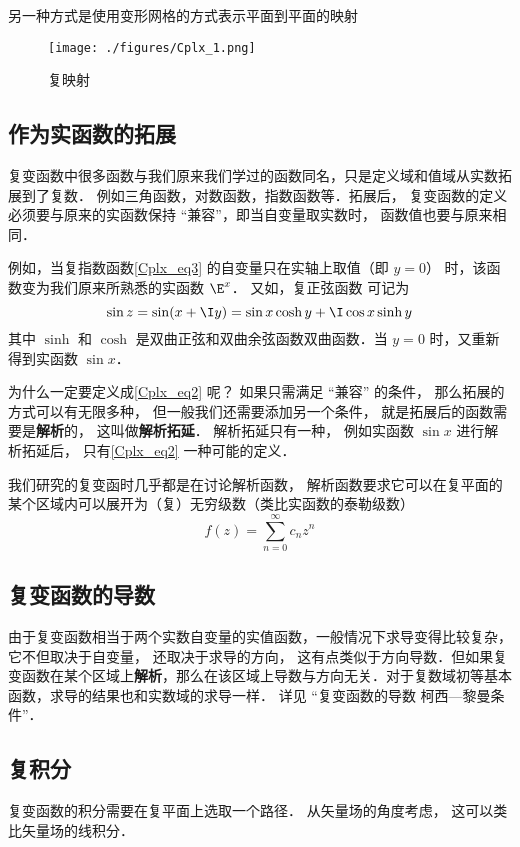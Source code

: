 另一种方式是使用变形网格的方式表示平面到平面的映射
\begin{figure}[ht]
\centering
\texttt{[image: ./figures/Cplx\_1.png]}
\caption{复映射} \label{Cplx_fig1}
\end{figure}

\subsection{作为实函数的拓展}
复变函数中很多函数与我们原来我们学过的函数同名，只是定义域和值域从实数拓展到了复数． 例如三角函数，对数函数，指数函数等．拓展后， 复变函数的定义必须要与原来的实函数保持 “兼容”，即当自变量取实数时， 函数值也要与原来相同．

例如，当复指数函数\autoref{Cplx_eq3} 的自变量只在实轴上取值（即 $y = 0$） 时，该函数变为我们原来所熟悉的实函数 $\E^x$．  又如，复正弦函数 可记为
\begin{equation}\label{Cplx_eq2}
\sin z = \sin(x + \I y) = \sin x\cosh y + \I\cos x\sinh y
\end{equation}
其中 $\sinh $ 和 $\cosh $ 是双曲正弦和双曲余弦函数双曲函数．当 $y = 0$ 时，又重新得到实函数 $\sin x$．

为什么一定要定义成\autoref{Cplx_eq2} 呢？ 如果只需满足 “兼容” 的条件， 那么拓展的方式可以有无限多种， 但一般我们还需要添加另一个条件， 就是拓展后的函数需要是\textbf{解析}的， 这叫做\textbf{解析拓延}． %
解析拓延只有一种， 例如实函数 $\sin x$ 进行解析拓延后， 只有\autoref{Cplx_eq2} 一种可能的定义．

我们研究的复变函时几乎都是在讨论解析函数， 解析函数要求它可以在复平面的某个区域内可以展开为（复）无穷级数（类比实函数的泰勒级数）
\begin{equation}
f(z) = \sum_{n=0}^\infty c_n z^n
\end{equation}

\subsection{复变函数的导数}
由于复变函数相当于两个实数自变量的实值函数，一般情况下求导变得比较复杂， 它不但取决于自变量， 还取决于求导的方向， 这有点类似于方向导数．但如果复变函数在某个区域上\textbf{解析}，那么在该区域上导数与方向无关．对于复数域初等基本函数，求导的结果也和实数域的求导一样． 详见 “复变函数的导数 柯西—黎曼条件”．

\subsection{复积分}
复变函数的积分需要在复平面上选取一个路径． 从矢量场的角度考虑， 这可以类比矢量场的线积分．
